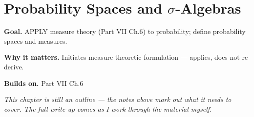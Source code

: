 \chapter{Probability Spaces and $\sigma$-Algebras}
\label{ch:11-probability-theory-01}

\begin{chapterintro}
\textbf{Goal.} APPLY measure theory (Part VII Ch.6) to probability; define probability spaces and measures.

\textbf{Why it matters.} Initiates measure-theoretic formulation — applies, does not re-derive.

\textbf{Builds on.} Part VII Ch.6
\end{chapterintro}

\textit{This chapter is still an outline --- the notes above mark out what it needs to cover. The full write-up comes as I work through the material myself.}
